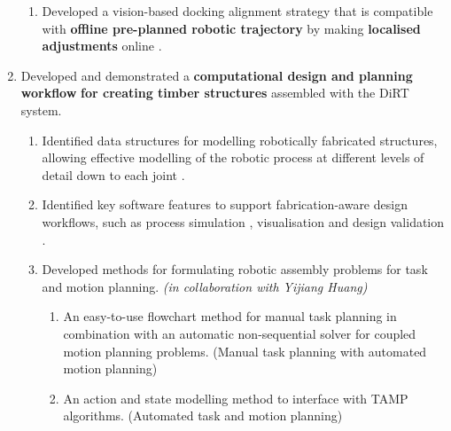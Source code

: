 \begin{enumerate}
\begin{enumerate}
		\item Developed a vision-based docking alignment strategy that is compatible with \textbf{offline pre-planned robotic trajectory} by making \textbf{localised adjustments} online .

	\end{enumerate}

	\item Developed and demonstrated a \textbf{computational design and planning workflow} \textbf{for creating timber structures} assembled with the DiRT system.
	\begin{enumerate}
		\item Identified data structures for modelling robotically fabricated structures, allowing effective modelling of the robotic process at different levels of detail down to each joint .

		\item Identified key software features to support fabrication-aware design workflows, such as process simulation , visualisation  and design validation .

		\item Developed methods for formulating robotic assembly problems for task and motion planning. \textit{(in collaboration with Yijiang Huang)} 

		\begin{enumerate}
			\item An easy-to-use flowchart method for manual task planning  in combination with an automatic non-sequential solver  for coupled motion planning problems. (Manual task planning with automated motion planning)

			\item An action and state modelling method to interface with TAMP algorithms. (Automated task and motion planning) 

		\end{enumerate}
	\end{enumerate}


\end{enumerate}
